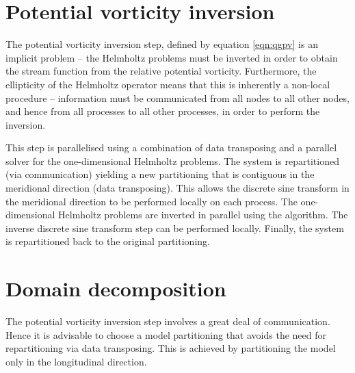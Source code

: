 \documentclass[a4paper]{book}
\begin{document}
\section{Potential vorticity inversion}\label{sect:pv_inversion_parallel}

The potential vorticity inversion step, defined by equation \eqref{eqn:qgpv} is
an implicit problem -- the Helmholtz problems must be inverted  in order to
obtain the stream function from the relative potential vorticity. Furthermore,
the ellipticity of the Helmholtz operator means that this is inherently a
non-local procedure -- information must be communicated from all nodes to all
other nodes, and hence from all processes to all other processes, in order to
perform the inversion.

This step is parallelised using a combination of data transposing and a
parallel solver for the one-dimensional Helmholtz problems. The system is
repartitioned (via communication) yielding a new partitioning that is contiguous
in the meridional direction (data transposing). This allows the discrete sine
transform in the meridional direction to be performed locally on each process.
The one-dimensional Helmholtz problems are inverted in parallel using the
\citet{schumann1995} algorithm. The inverse discrete sine transform step can be
performed locally. Finally, the system is repartitioned back to the original
partitioning.

\section{Domain decomposition}\label{sect:decomposition}

The potential vorticity inversion step involves a great deal of communication.
Hence it is advisable to choose a model partitioning that avoids the need
for repartitioning via data transposing. This is achieved by partitioning the
model only in the longitudinal direction.
\end{document}
